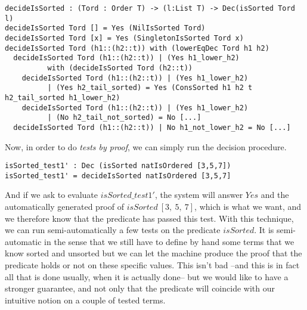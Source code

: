 \begin{lstlisting}
decideIsSorted : (Tord : Order T) -> (l:List T) -> Dec(isSorted Tord l)
decideIsSorted Tord [] = Yes (NilIsSorted Tord)
decideIsSorted Tord [x] = Yes (SingletonIsSorted Tord x)
decideIsSorted Tord (h1::(h2::t)) with (lowerEqDec Tord h1 h2)
  decideIsSorted Tord (h1::(h2::t)) | (Yes h1_lower_h2) 
          with (decideIsSorted Tord (h2::t))
    decideIsSorted Tord (h1::(h2::t)) | (Yes h1_lower_h2) 
          | (Yes h2_tail_sorted) = Yes (ConsSorted h1 h2 t h2_tail_sorted h1_lower_h2)
    decideIsSorted Tord (h1::(h2::t)) | (Yes h1_lower_h2) 
          | (No h2_tail_not_sorted) = No [...]
  decideIsSorted Tord (h1::(h2::t)) | No h1_not_lower_h2 = No [...]
\end{lstlisting}
Now, in order to do \emph{tests by proof}, we can simply run the decision procedure.

\begin{lstlisting}
isSorted_test1' : Dec (isSorted natIsOrdered [3,5,7])
isSorted_test1' = decideIsSorted natIsOrdered [3,5,7] 
\end{lstlisting}
And if we ask to evaluate $isSorted\_test1'$, the system will answer $Yes$ and the automatically generated proof of $isSorted\ [3,\ 5,\ 7]$, which is what we want, and we therefore know that the predicate has passed this test. With this technique, we can run semi-automatically a few tests on the predicate $isSorted$. It is semi-automatic in the sense that we still have to define by hand some terms that we know sorted and unsorted but we can let the machine produce the proof that the predicate holds or not on these specific values. This isn't bad --and this is in fact all that is done usually, when it is actually done-- but we would like to have a stronger guarantee, and not only that the predicate will coincide with our intuitive notion on a couple of tested terms.





